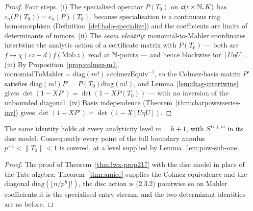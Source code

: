 \begin{proof}
  \leanok
  Four steps.  (i) The specialised operator $P(T_0)$ on $c(\iota\times\mathbb{N},K)$ has
  $c_n\bigl(P(T_0)\bigr) = c_n(P)(T_0)$, because specialisation is a continuous ring homomorphism
  (Definition~\ref{def:halo-specialize}) and the coefficients are limits of determinants of
  minors.  (ii) The \emph{seam identity}: monomial-to-Mahler coordinates intertwine the analytic
  action of a certificate matrix with $P(T_0)$ --- both are $f\mapsto \chi(cz+d)f(\text{M\"ob}\,z)$
  read at $\mathbb{N}$-points --- and hence blockwise for $[U\eta U]$.  (iii) By
  Proposition~\ref{prop:colmez-m1}, $\mathrm{monomialToMahler} = \mathrm{diag}(m!)\circ
  \mathrm{colmezEquiv}^{-1}$, so the Colmez-basis matrix $P'$ satisfies
  $\mathrm{diag}(m!)P' = P(T_0)\mathrm{diag}(m!)$, and Lemma~\ref{lem:diag-intertwine} gives
  $\det(1-XP') = \det(1-XP(T_0))$ --- with no inversion of the unbounded diagonal.  (iv) Basis
  independence (Theorem~\ref{thm:charpowerseries-inv}) gives
  $\det(1-XP') = \det(1-X[U\eta U])$.
\end{proof}

\begin{theorem}
  \label{thm:lwx-prop217-h}
  \leanok
  The same identity holds at every analyticity level $m = h+1$, with $S^{D,\dagger,m}$ in its
  disc model.  Consequently every point of the full boundary annulus
  $p^{-1}<\lVert T_0\rVert<1$ is covered, at a level supplied by Lemma~\ref{lem:pow-sub-one}.
\end{theorem}

\begin{proof}
  \leanok
  The proof of Theorem~\ref{thm:lwx-prop217} with the disc model in place of the Tate algebra:
  Theorem~\ref{thm:amice} supplies the Colmez equivalence and the diagonal
  $\mathrm{diag}(\lfloor n/p^{h}\rfloor!)$, the disc action is (2.3.2) pointwise so on Mahler
  coefficients it is the specialised entry stream, and the two determinant identities are as
  before.
\end{proof}

